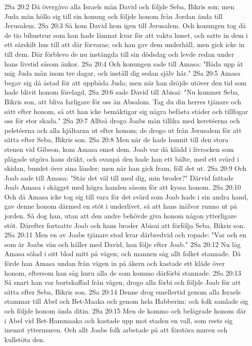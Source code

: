 2Sa 20:2  Då övergåvo alla Israels män David och följde Seba, Bikris son; men Juda män höllo sig till sin konung och följde honom från Jordan ända till Jerusalem.
2Sa 20:3  Så kom David hem igen till Jerusalem. Och konungen tog då de tio bihustrur som han hade lämnat kvar för att vakta huset, och satte in dem i ett särskilt hus till att där förvaras; och han gav dem underhåll, men gick icke in till dem. Där förblevo de nu instängda till sin dödsdag och levde redan under hans livstid såsom änkor.
2Sa 20:4  Och konungen sade till Amasa: "Båda upp åt mig Juda män inom tre dagar, och inställ dig sedan själv här."
2Sa 20:5  Amasa begav sig då åstad för att uppbåda Juda; men när han dröjde utöver den tid som hade blivit honom förelagd,
2Sa 20:6  sade David till Abisai: "Nu kommer Seba, Bikris son, att bliva farligare för oss än Absalom. Tag du din herres tjänare och sätt efter honom, så att han icke bemäktigar sig några befästa städer och tillfogar oss för stor skada."
2Sa 20:7  Alltså drogo Joabs män tillika med keretéerna och peletéerna och alla hjältarna ut efter honom; de drogo ut från Jerusalem för att sätta efter Seba, Bikris son.
2Sa 20:8  Men när de hade hunnit till den stora stenen vid Gibeon, kom Amasa emot dem. Joab var då klädd i livrocken som plägade utgöra hans dräkt, och ovanpå den hade han ett bälte, med ett svärd i skidan, bundet över sina länder; men när han gick fram, föll det ut.
2Sa 20:9  Och Joab sade till Amasa: "Står det väl till med dig, min broder?" Därvid fattade Joab Amasa i skägget med högra handen såsom för att kyssa honom.
2Sa 20:10  Och då Amasa icke tog sig till vara för det svärd som Joab hade i sin andra hand, gav denne honom därmed en stöt i underlivet, så att hans inälvor runno ut på jorden. Så dog han, utan att den andre behövde giva honom någon ytterligare stöt. Därefter fortsatte Joab och hans broder Abisai att förfölja Seba, Bikris son.
2Sa 20:11  Men en av Joabs tjänare stod kvar därbredvid och ropade: "Var och en som är Joabs vän och håller med David, han följe efter Joab."
2Sa 20:12  Nu låg Amasa sölad i sitt blod mitt på vägen; och mannen såg allt folket stannade. Då förde han Amasa undan från vägen in på åkern och kastade ett kläde över honom, eftersom han såg huru alla de som kommo därförbi stannade.
2Sa 20:13  Så snart han var bortskaffad från vägen, drogo alla förbi och följde Joab för att sätta efter Seba, Bikris son.
2Sa 20:14  Denne drog emellertid genom alla Israels stammar till Abel och Bet-Maaka och genom hela Habberim; och folk samlade sig och följde honom ända ditin.
2Sa 20:15  Men de kommo och belägrade honom där i Abel vid Bet-Hammaaka och kastade upp mot staden en vall, som reste sig inemot yttermuren. Och allt Joabs folk arbetade på att förstöra muren och kullstöta den.
